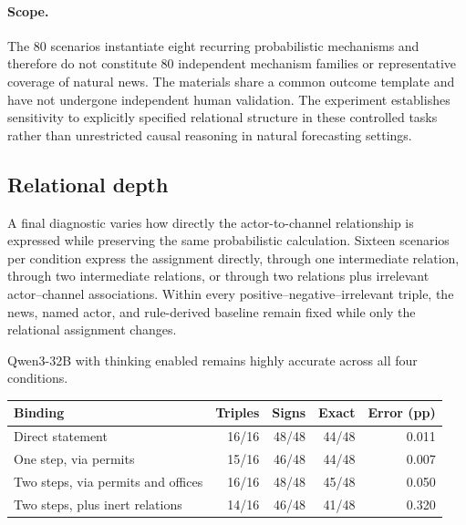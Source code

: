 \paragraph{Scope.}

The 80 scenarios instantiate eight recurring probabilistic mechanisms and therefore do not constitute 80 independent mechanism families or representative coverage of natural news.
The materials share a common outcome template and have not undergone independent human validation.
The experiment establishes sensitivity to explicitly specified relational structure in these controlled tasks rather than unrestricted causal reasoning in natural forecasting settings.

\subsection{Relational depth}
\label{app:exp1-ladder}

A final diagnostic varies how directly the actor-to-channel relationship is expressed while preserving the same probabilistic calculation.
Sixteen scenarios per condition express the assignment directly, through one intermediate relation, through two intermediate relations, or through two relations plus irrelevant actor--channel associations.
Within every positive--negative--irrelevant triple, the news, named actor, and rule-derived baseline remain fixed while only the relational assignment changes.

Qwen3-32B with thinking enabled remains highly accurate across all four conditions.

\begin{center}
\begin{minipage}{\linewidth}
\centering
{}
\label{tab:exp1-ladder}
\small
\begin{tabular}{lrrrr}
\toprule
Binding & Triples & Signs & Exact & Error (pp) \\
\midrule
Direct statement & 16/16 & 48/48 & 44/48 & 0.011 \\
One step, via permits & 15/16 & 46/48 & 44/48 & 0.007 \\
Two steps, via permits and offices & 16/16 & 48/48 & 45/48 & 0.050 \\
Two steps, plus inert relations & 14/16 & 46/48 & 41/48 & 0.320 \\
\bottomrule
\end{tabular}
\end{minipage}
\end{center}

